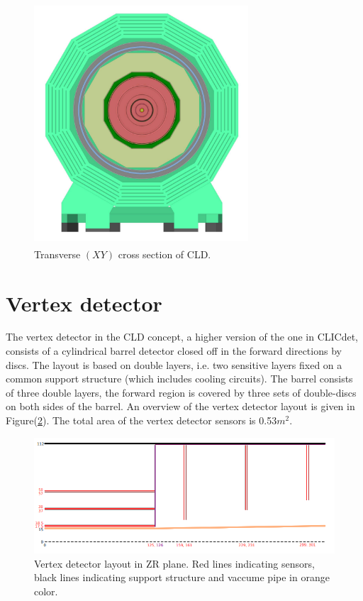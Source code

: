 \begin{figure}
    \centering
    \includegraphics[width = 8cm, height = 9cm]{fcc_det/ph3.png}
    \caption{Transverse $(XY)$ cross section of CLD.}
    \label{fig:mymodel3}
\end{figure}

\section{Vertex detector}
The vertex detector in the CLD concept, a higher  version of the 
one in CLICdet, consists of a cylindrical
barrel detector closed off in the forward directions by discs. 
The layout is based on double layers, i.e.
two sensitive layers fixed on a common support structure (which 
includes cooling circuits). The barrel
consists of three double layers, the forward region is covered 
by three sets of double-discs on both sides
of the barrel. An overview of the vertex detector layout is 
given in Figure(\ref{fig:vertex}). The total area of the vertex
detector sensors is 0.53$m^2$.
\begin{figure}[ht]
    \centering
    \includegraphics[width = 1\linewidth]{fcc_det/ph14.png}
    \caption{Vertex detector layout in ZR plane. Red lines indicating sensors, black lines indicating support structure and vaccume pipe in orange color.}
    \label{fig:vertex}
\end{figure}


